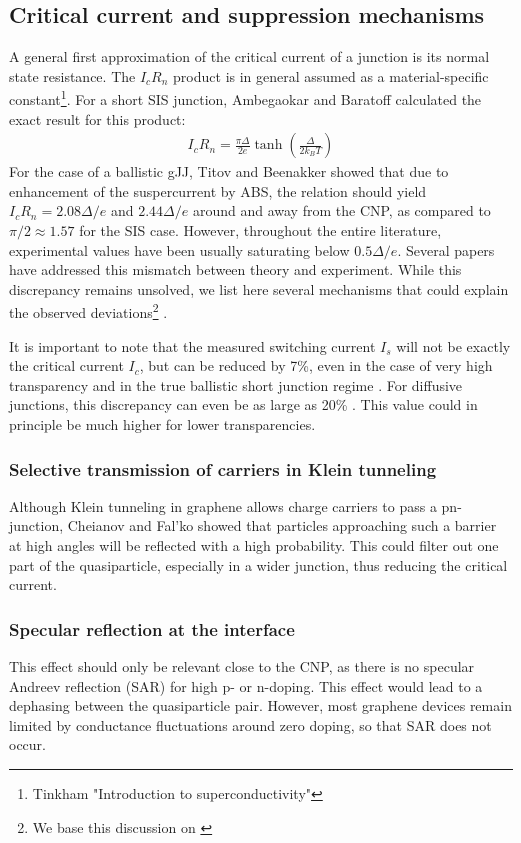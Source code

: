 \subsection{Critical current and suppression mechanisms}
A general first approximation of the critical current of a junction is its normal state resistance. The $I_c R_n$ product is in general assumed as a material-specific constant\footnote{Tinkham "Introduction to superconductivity"}. For a short SIS junction, Ambegaokar and Baratoff calculated the exact result for this product:
\begin{eqnarray}
I_c R_n = \frac{\pi\Delta}{2e}\tanh\left(\frac{\Delta}{2k_BT}\right)
\end{eqnarray}
For the case of a ballistic gJJ, Titov and Beenakker showed that due to enhancement of the suspercurrent by ABS, the relation should yield $I_cR_n=2.08\Delta/e$ and $2.44\Delta/e$ around and away from the CNP, as compared to $\pi/2\approx1.57$ for the SIS case. However, throughout the entire literature, experimental values have been usually saturating below $0.5\Delta/e$. Several papers have addressed this mismatch between theory and experiment. While this discrepancy remains unsolved, we list here several mechanisms that could explain the observed deviations\footnote{We base this discussion on \cite{choi_complete_2013}} .

It is important to note that the measured switching current $I_s$ will not be exactly the critical current $I_c$, but can be reduced by 7\%, even in the case of very high transparency and in the true ballistic short junction regime \cite{lee_ultimately_2015}. For diffusive junctions, this discrepancy can even be as large as 20\% \cite{ke_critical_2016}. This value could in principle be much higher for lower transparencies.

\subsubsection{Selective transmission of carriers in Klein tunneling}
Although Klein tunneling in graphene allows charge carriers to pass a pn-junction, Cheianov and Fal'ko showed that particles approaching such a barrier at high angles will be reflected with a high probability.\cite{chialvo_current-phase_2010} This could filter out one part of the quasiparticle, especially in a wider junction, thus reducing the critical current.\cite{ben_shalom_quantum_2015}

\subsubsection{Specular reflection at the interface}
This effect should only be relevant close to the CNP, as there is no specular Andreev reflection (SAR) for high p- or n-doping. This effect would lead to a dephasing between the quasiparticle pair. However, most graphene devices remain limited by conductance fluctuations around zero doping, so that SAR does not occur.

